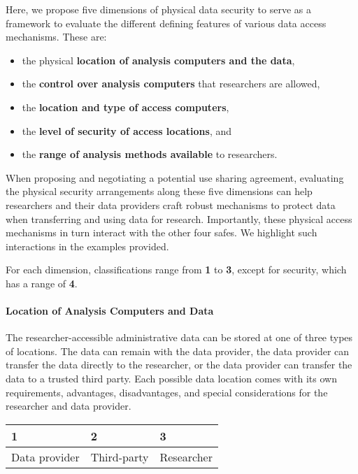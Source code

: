 Here, we propose five dimensions of physical data security to serve as a
framework to evaluate the different defining features of various data
access mechanisms. These are:

\begin{itemize}
\tightlist
\item
  the physical \textbf{location of analysis computers and the data},
\item
  the \textbf{control over analysis computers} that researchers are
  allowed,
\item
  the \textbf{location and type of access computers},
\item
  the \textbf{level of security of access locations}, and
\item
  the \textbf{range of analysis methods available} to researchers.
\end{itemize}

When proposing and negotiating a potential use sharing agreement,
evaluating the physical security arrangements along these five
dimensions can help researchers and their data providers craft robust
mechanisms to protect data when transferring and using data for
research. Importantly, these physical access mechanisms in turn interact
with the other four safes. We highlight such interactions in the
examples provided.

For each dimension, classifications range from \textbf{1} to \textbf{3},
except for security, which has a range of \textbf{4}.

\hypertarget{location-of-analysis-computers-and-data}{%
\paragraph{Location of Analysis Computers and
Data}\label{location-of-analysis-computers-and-data}}

The researcher-accessible administrative data can be stored at one of
three types of locations. The data can remain with the data provider,
the data provider can transfer the data directly to the researcher, or
the data provider can transfer the data to a trusted third party. Each
possible data location comes with its own requirements, advantages,
disadvantages, and special considerations for the researcher and data
provider.

\begin{longtable}[]{@{}lll@{}}
\toprule
1 & 2 & 3\tabularnewline
\midrule
\endhead
Data provider & Third-party & Researcher\tabularnewline
\bottomrule
\end{longtable}

